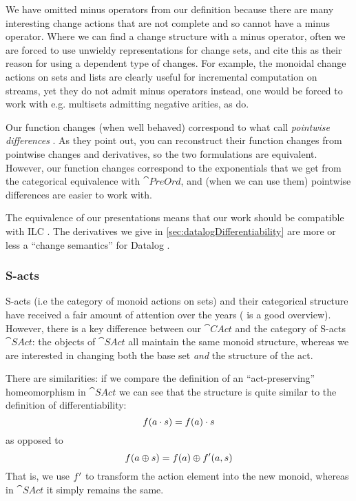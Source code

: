 We have omitted minus operators from our definition because
there are many interesting change actions that are not complete and so cannot
have a minus operator. Where we can find a change structure with a minus operator, often we are
forced to use unwieldy representations for change sets, and
\citeauthor{cai2014changes} cite this as their reason for using a dependent
type of changes. For example, the monoidal change actions on sets and lists are clearly
useful for incremental computation on streams, yet they do not admit minus
operators \textemdash{} instead, one would
be forced to work with e.g. multisets admitting negative arities, as \citeauthor{cai2014changes} do.

Our function changes (when well behaved) correspond to what \citeauthor{cai2014changes} call
\emph{pointwise differences} \autocite[see][section 2.2]{cai2014changes}. As
they point out, you can reconstruct their
function changes from pointwise changes and derivatives, so the two formulations
are equivalent. However, our function changes correspond to the
exponentials that we get from the categorical equivalence with $\cat{PreOrd}$,
and (when we can use them) pointwise differences are easier to work with.

The equivalence of our presentations means that our work should be compatible
with ILC \autocite[see][section 3]{cai2014changes}. The derivatives we give in \cref{sec:datalogDifferentiability} are more or
less a ``change semantics'' for Datalog \autocite[see][section
3.5]{cai2014changes}. 

\subsubsection{S-acts}
\label{sec:sacts}

S-acts (i.e the category of monoid actions on sets) and their categorical structure have received a fair amount of attention
over the years (\textcite{kilp2000monoids} is a good
overview). However, there is a key difference between our $\cat{CAct}$ and the category of
S-acts $\cat{SAct}$: the objects of $\cat{SAct}$ all maintain the same monoid
structure, whereas we are interested in changing both the base set \emph{and} the structure of the act.

There are similarities: if we compare the definition of an ``act-preserving''
homeomorphism in $\cat{SAct}$ \autocite[see][]{kilp2000monoids} we can see that the structure is
quite similar to the definition of differentiability:
\begin{displaymath}
  f(a \cdot s) = f(a) \cdot s
\end{displaymath}
as opposed to
\begin{displaymath}
  f(a \oplus s) = f(a) \oplus f'(a, s)
\end{displaymath}
That is, we use $f'$ to transform the action element into the new
monoid, whereas in $\cat{SAct}$ it simply remains the same.


